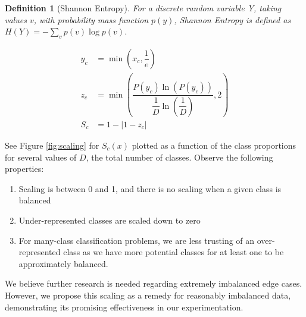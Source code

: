 \documentclass{article} %
\newtheorem{definition}{Definition}
\begin{document}
\begin{definition}[Shannon Entropy] For a discrete random variable Y, taking values $v$, with probability mass function $p(y)$, Shannon Entropy is defined as $H(Y) = - \sum_{v} p(v) \log p(v)$.
    
\end{definition}

\begin{align}
    y_c &= \min \left( x_c, \dfrac{1}{e} \right) \\
    z_c &= \min \left( \dfrac{P(y_c) \ln \left( P(y_c) \right)}{\dfrac{1}{D} \ln \left( \dfrac{1}{D} \right)}, 2 \right) \\
    S_c &= 1 - | 1 - z_c |    
\end{align}

See Figure \ref{fig:scaling} for $S_c(x)$ plotted as a function of the class proportions for several values of $D$, the total number of classes. Observe the following  properties:
\begin{enumerate}
    \item Scaling is between 0 and 1, and there is no scaling when a given class is balanced
    \item Under-represented classes are scaled down to zero
    \item For many-class classification problems, we are less trusting of an over-represented class as we have more potential classes for at least one to be approximately balanced.
\end{enumerate}

We believe further research is needed regarding extremely imbalanced edge cases. However, we propose this scaling as a remedy for reasonably imbalanced data, demonstrating its promising effectiveness in our experimentation.
\end{document}
